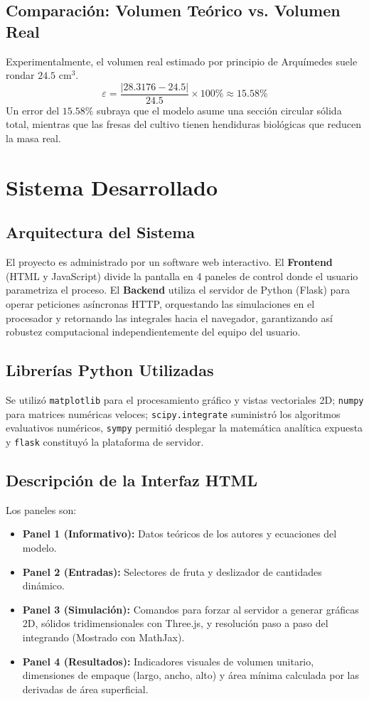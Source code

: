 \documentclass[conference, Spanish]{IEEEtran}
\begin{document}
\subsection{Comparación: Volumen Teórico vs. Volumen Real}
Experimentalmente, el volumen real estimado por principio de Arquímedes suele rondar $24.5$ cm$^3$.
\begin{equation}
\varepsilon = \frac{|28.3176 - 24.5|}{24.5} \times 100\% \approx 15.58\%
\end{equation}
Un error del $15.58\%$ subraya que el modelo asume una sección circular sólida total, mientras que las fresas del cultivo tienen hendiduras biológicas que reducen la masa real.

\section{Sistema Desarrollado}
\subsection{Arquitectura del Sistema}
El proyecto es administrado por un software web interactivo. El \textbf{Frontend} (HTML y JavaScript) divide la pantalla en 4 paneles de control donde el usuario parametriza el proceso. El \textbf{Backend} utiliza el servidor de Python (Flask) para operar peticiones asíncronas HTTP, orquestando las simulaciones en el procesador y retornando las integrales hacia el navegador, garantizando así robustez computacional independientemente del equipo del usuario.

\subsection{Librerías Python Utilizadas}
Se utilizó \texttt{matplotlib} para el procesamiento gráfico y vistas vectoriales 2D; \texttt{numpy} para matrices numéricas veloces; \texttt{scipy.integrate} suministró los algoritmos evaluativos numéricos, \texttt{sympy} permitió desplegar la matemática analítica expuesta y \texttt{flask} constituyó la plataforma de servidor.

\subsection{Descripción de la Interfaz HTML}
Los paneles son:
\begin{itemize}
    \item \textbf{Panel 1 (Informativo):} Datos teóricos de los autores y ecuaciones del modelo.
    \item \textbf{Panel 2 (Entradas):} Selectores de fruta y deslizador de cantidades dinámico.
    \item \textbf{Panel 3 (Simulación):} Comandos para forzar al servidor a generar gráficas 2D, sólidos tridimensionales con Three.js, y resolución paso a paso del integrando (Mostrado con MathJax).
    \item \textbf{Panel 4 (Resultados):} Indicadores visuales de volumen unitario, dimensiones de empaque (largo, ancho, alto) y área mínima calculada por las derivadas de área superficial.
\end{itemize}
\end{document}
